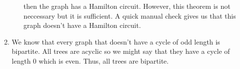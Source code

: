 \documentclass[12pt]{article}
\begin{document}
\begin{enumerate}
\begin{itemize}
        then the graph has a Hamilton circuit. \newline
        However, this theorem is not neccessary but it is sufficient. \newline
        A quick manual check gives us that this graph doesn't have a Hamilton circuit.      
    \end{itemize}
    \item
      We know that every graph that doesn't have a cycle of odd length is bipartite. \newline
      All trees are acyclic so we might say that they have a cycle of length $0$ which is even. \newline
      Thus, all trees are bipartite.
\end{enumerate}
\end{document}
